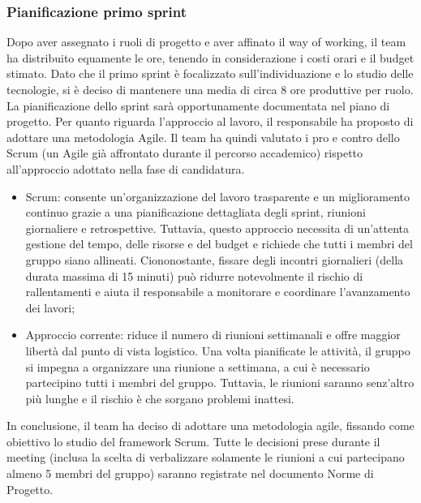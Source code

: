 \subsubsection{Pianificazione primo sprint}
Dopo aver assegnato i ruoli di progetto e aver affinato il way of working, il team ha distribuito equamente le ore, tenendo in considerazione i costi orari e il budget stimato. Dato che il primo sprint è focalizzato sull'individuazione e lo studio delle tecnologie, si è deciso di mantenere una media di circa 8 ore produttive per ruolo. La pianificazione dello sprint sarà opportunamente documentata nel piano di progetto. Per quanto riguarda l'approccio al lavoro, il responsabile ha proposto di adottare una metodologia Agile. Il team ha quindi valutato i pro e contro dello Scrum (un  Agile già affrontato durante il percorso accademico) rispetto all'approccio adottato nella fase di candidatura.
\begin{itemize}
	\item Scrum: consente un'organizzazione del lavoro trasparente e un miglioramento continuo grazie a una pianificazione dettagliata degli sprint, riunioni giornaliere e retrospettive. Tuttavia, questo approccio necessita di un'attenta gestione del tempo, delle risorse e del budget e richiede che tutti i membri del gruppo siano allineati. Ciononostante, fissare degli incontri giornalieri (della durata massima di 15 minuti) può ridurre notevolmente il rischio di rallentamenti e aiuta il responsabile a monitorare e coordinare l'avanzamento dei lavori;
	\item Approccio corrente: riduce il numero di riunioni settimanali e offre maggior libertà dal punto di vista logistico. Una volta pianificate le attività, il gruppo si impegna a organizzare una riunione a settimana, a cui è necessario partecipino tutti i membri del gruppo. Tuttavia, le riunioni saranno senz'altro più lunghe e il rischio è che sorgano problemi inattesi.
\end{itemize}

\vspace{0.5\baselineskip}
In conclusione, il team ha deciso di adottare una metodologia agile, fissando come obiettivo lo studio del framework Scrum. Tutte le decisioni prese durante il meeting (inclusa la scelta di verbalizzare solamente le riunioni a cui partecipano almeno 5 membri del gruppo) saranno registrate nel documento Norme di Progetto.
\clearpage
